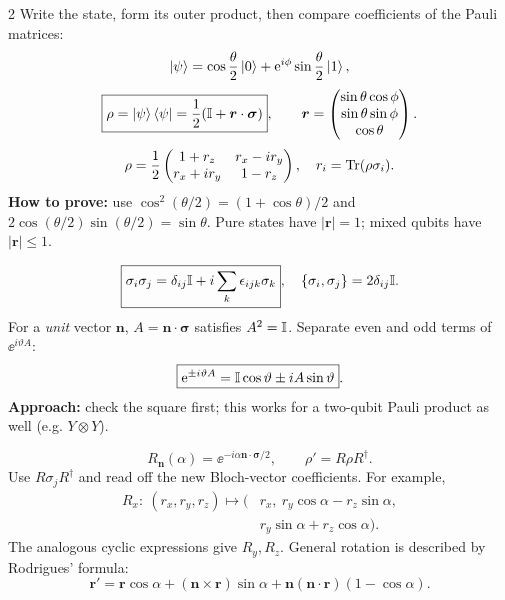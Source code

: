 \begin{multicols}{2}\small
{}
Write the state, form its outer product, then compare coefficients of the Pauli matrices:
\[\left\lvert \psi\right\rangle=\cos\frac\theta2\left\lvert 0\right\rangle+\mathrm e^{i\phi}\sin\frac\theta2\left\lvert 1\right\rangle,\]
\[\boxed{\rho=\left\lvert \psi\right\rangle\left\langle \psi\right\rvert=\frac12(\mathbb I+\bm r\cdot\bm\sigma)},\qquad
\bm r=\begin{pmatrix}\sin\theta\cos\phi\\\sin\theta\sin\phi\\\cos\theta\end{pmatrix}.\]
\[\rho=\frac12\begin{pmatrix}1+r_z&r_x-ir_y\\r_x+ir_y&1-r_z\end{pmatrix},\quad
r_i=\operatorname{Tr}(\rho\sigma_i).\]
\textbf{How to prove:} use $\cos^2(\theta/2)=(1+\cos\theta)/2$ and $2\cos(\theta/2)\sin(\theta/2)=\sin\theta$. Pure states have $|\bm r|=1$; mixed qubits have $|\bm r|\le1$.

\[\boxed{\sigma_i\sigma_j=\delta_{ij}\mathbb I+i\sum_k\epsilon_{ijk}\sigma_k},\quad
\{\sigma_i,\sigma_j\}=2\delta_{ij}\mathbb I.\]
For a \emph{unit} vector $\bm n$, $A=\bm n\cdot\bm\sigma$ satisfies $A^2=\mathbb I$. Separate even and odd terms of $\ee^{i\vartheta A}$:
\[\boxed{\mathrm e^{\pm i\vartheta A}=\mathbb I\cos\vartheta\pm iA\sin\vartheta}.\]
\textbf{Approach:} check the square first; this works for a two-qubit Pauli product as well (e.g. $Y\otimes Y$).

\[\boxed{R_{\bm n}(\alpha)=\ee^{-i\alpha\bm n\cdot\bm\sigma/2}},\qquad
\rho'=R\rho R^\dagger.\]
Use $R\sigma_jR^\dagger$ and read off the new Bloch-vector coefficients. For example,
\[\begin{aligned}R_x:\ (r_x,r_y,r_z)\mapsto \big(&r_x,\ r_y\cos\alpha-r_z\sin\alpha,\\&r_y\sin\alpha+r_z\cos\alpha\big).\end{aligned}\]
The analogous cyclic expressions give $R_y,R_z$. General rotation is described by Rodrigues' formula:
\[\boxed{\bm r'=\bm r\cos\alpha+(\bm n\times\bm r)\sin\alpha+\bm n(\bm n\cdot\bm r)(1-\cos\alpha)}.\]


\end{multicols}
